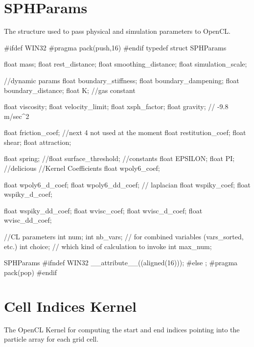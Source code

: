 \section{SPHParams}
The structure used to pass physical and simulation parameters to OpenCL.
\begin{cppcode}{0}

#ifdef WIN32
#pragma pack(push,16)
#endif
typedef struct SPHParams
    {
        float mass;
        float rest_distance;
        float smoothing_distance;
        float simulation_scale;

        //dynamic params
        float boundary_stiffness;
        float boundary_dampening;
        float boundary_distance;
        float K;        //gas constant

        float viscosity;
        float velocity_limit;
        float xsph_factor;
        float gravity; // -9.8 m/sec^2

        float friction_coef;
        //next 4 not used at the moment
        float restitution_coef;
        float shear;
        float attraction;

        float spring;
        //float surface_threshold;
        //constants
        float EPSILON;
        float PI;       //delicious
        //Kernel Coefficients
        float wpoly6_coef;

        float wpoly6_d_coef;
        float wpoly6_dd_coef; // laplacian
        float wspiky_coef;
        float wspiky_d_coef;

        float wspiky_dd_coef;
        float wvisc_coef;
        float wvisc_d_coef;
        float wvisc_dd_coef;


        //CL parameters
        int num;
        int nb_vars; // for combined variables (vars_sorted, etc.)
        int choice; // which kind of calculation to invoke
        int max_num;

 } SPHParams
#ifndef WIN32
    __attribute__((aligned(16)));
#else
        ;
        #pragma pack(pop)
#endif

\end{cppcode}

\section{Cell Indices Kernel}
The OpenCL Kernel for computing the start and end indices pointing into the
particle array for each grid cell.

